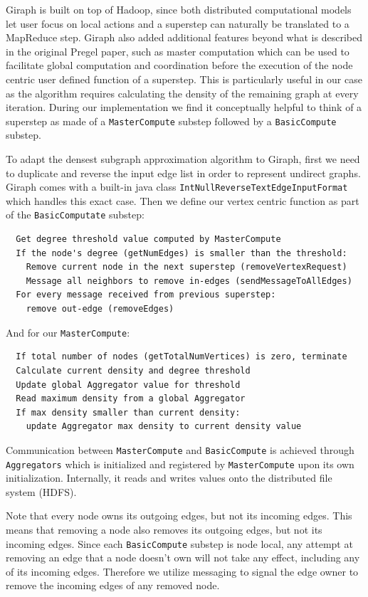 \documentclass{article}
\begin{document}
Giraph is built on top of Hadoop, since both distributed computational models let user focus on local actions and a superstep can naturally be translated to a MapReduce step. Giraph also added additional features beyond what is described in the original Pregel paper, such as master computation which can be used to facilitate global computation and coordination before the execution of the node centric user defined function of a superstep. This is particularly useful in our case as the algorithm requires calculating the density of the remaining graph at every iteration. During our implementation we find it conceptually helpful to think of a superstep as made of a \texttt{MasterCompute} substep followed by a \texttt{BasicCompute} substep.

To adapt the densest subgraph approximation algorithm to Giraph, first we need to duplicate and reverse the input edge list in order to represent undirect graphs. Giraph comes with a built-in java class \texttt{IntNullReverseTextEdgeInputFormat} which handles this exact case. Then we define our vertex centric function as part of the \texttt{BasicComputate} substep:

\begin{lstlisting}
  Get degree threshold value computed by MasterCompute
  If the node's degree (getNumEdges) is smaller than the threshold:
    Remove current node in the next superstep (removeVertexRequest)
    Message all neighbors to remove in-edges (sendMessageToAllEdges)
  For every message received from previous superstep:
    remove out-edge (removeEdges)
\end{lstlisting}

And for our \texttt{MasterCompute}:

\begin{lstlisting}
  If total number of nodes (getTotalNumVertices) is zero, terminate
  Calculate current density and degree threshold
  Update global Aggregator value for threshold
  Read maximum density from a global Aggregator
  If max density smaller than current density:
    update Aggregator max density to current density value
\end{lstlisting}

Communication between \texttt{MasterCompute} and \texttt{BasicCompute} is achieved through \texttt{Aggregators} which is initialized and registered by \texttt{MasterCompute} upon its own initialization. Internally, it reads and writes values onto the distributed file system (HDFS).

Note that every node owns its outgoing edges, but not its incoming edges. This means that removing a node also removes its outgoing edges, but not its incoming edges. Since each \texttt{BasicCompute} substep is node local, any attempt at removing an edge that a node doesn't own will not take any effect, including any of its incoming edges. Therefore we utilize messaging to signal the edge owner to remove the incoming edges of any removed node.
\end{document}
